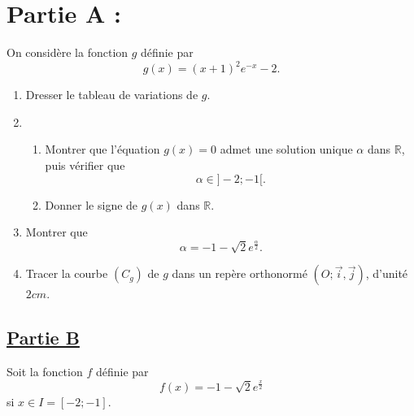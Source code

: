 \documentclass[12pt,a4paper]{article}
\begin{document}
\section*{ \quad \textbf{Partie A :}} 

On considère la fonction \( g \) définie par  
\[
g(x) = (x+1)^2 e^{-x} - 2.
\]

\begin{enumerate}
    \item Dresser le tableau de variations de \( g \).
    \item 
    \begin{enumerate}
        \item Montrer que l’équation \( g(x) = 0 \) admet une solution unique \( \alpha \) dans \( \mathbb{R} \), puis vérifier que  
        \[
        \alpha \in ]-2; -1[.
        \]
        \item Donner le signe de \( g(x) \) dans \( \mathbb{R} \).
    \end{enumerate}
    \item Montrer que  
    \[
    \alpha = -1 - \sqrt{2} e^{\frac{\alpha}{2}}.
    \]
    \item Tracer la courbe \( (C_g) \) de \( g \) dans un repère orthonormé \( (O; \vec{i}, \vec{j}) \), d’unité \( 2cm \).
\end{enumerate}

\subsection*{\underline{\textbf{Partie B}}}

Soit la fonction \( f \) définie par  
\[
f(x) = -1 - \sqrt{2} e^{\frac{x}{2}}
\]
si \( x \in I = [-2; -1] \).
\end{document}
